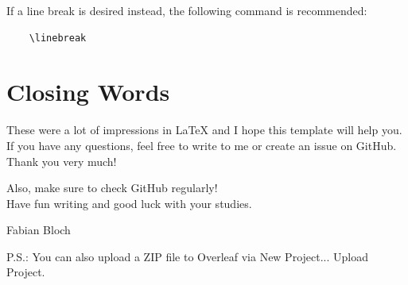 If a line break is desired instead, the following command is recommended:

\begin{verbatim}
    \linebreak
\end{verbatim}


\vfill
\section{Closing Words}

These were a lot of impressions in \LaTeX{} and I hope this template will help you.\\

If you have any questions, feel free to write to me or create an issue on GitHub. Thank you very much!

Also, make sure to check GitHub regularly!\\

Have fun writing and good luck with your studies.

Fabian Bloch

\vspace{7mm}
\textcolor{HCU}{P.S.: You can also upload a ZIP file to Overleaf via \glqq New Project... Upload Project\grqq{}.}
